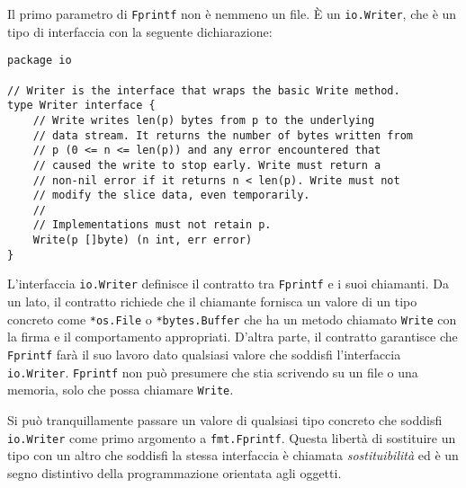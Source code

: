 Il primo parametro di \verb|Fprintf| non è nemmeno un file.
È un \verb|io.Writer|, che è un tipo di interfaccia con la seguente dichiarazione:
\begin{lstlisting}[frame=single, label={lst:lstlisting6-1.2}]
package io

// Writer is the interface that wraps the basic Write method.
type Writer interface {
    // Write writes len(p) bytes from p to the underlying
    // data stream. It returns the number of bytes written from
    // p (0 <= n <= len(p)) and any error encountered that
    // caused the write to stop early. Write must return a
    // non-nil error if it returns n < len(p). Write must not
    // modify the slice data, even temporarily.
    //
    // Implementations must not retain p.
    Write(p []byte) (n int, err error)
}
\end{lstlisting}
L'interfaccia \verb|io.Writer| definisce il contratto tra \verb|Fprintf| e i suoi chiamanti.
Da un lato, il contratto richiede che il chiamante fornisca un valore di un tipo concreto come \verb|*os.File| o \verb|*bytes.Buffer| che ha un metodo chiamato \verb|Write| con la firma e il comportamento appropriati.
D'altra parte, il contratto garantisce che \verb|Fprintf| farà il suo lavoro dato qualsiasi valore che soddisfi l'interfaccia \verb|io.Writer|.
\verb|Fprintf| non può presumere che stia scrivendo su un file o una memoria, solo che possa chiamare \verb|Write|.

Si può tranquillamente passare un valore di qualsiasi tipo concreto che soddisfi \verb|io.Writer| come primo argomento a \verb|fmt.Fprintf|.
Questa libertà di sostituire un tipo con un altro che soddisfi la stessa interfaccia è chiamata \textit{sostituibilità} ed è un segno distintivo della programmazione orientata agli oggetti.

